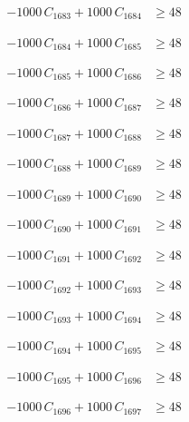 \documentclass[a4paper,11pt]{article}
\begin{document}
\begin{align}
-1000\,C_{1683} + 1000\,C_{1684} &\geq 48 \nonumber
\end{align}

\begin{align}
-1000\,C_{1684} + 1000\,C_{1685} &\geq 48 \nonumber
\end{align}

\begin{align}
-1000\,C_{1685} + 1000\,C_{1686} &\geq 48 \nonumber
\end{align}

\begin{align}
-1000\,C_{1686} + 1000\,C_{1687} &\geq 48 \nonumber
\end{align}

\begin{align}
-1000\,C_{1687} + 1000\,C_{1688} &\geq 48 \nonumber
\end{align}

\begin{align}
-1000\,C_{1688} + 1000\,C_{1689} &\geq 48 \nonumber
\end{align}

\begin{align}
-1000\,C_{1689} + 1000\,C_{1690} &\geq 48 \nonumber
\end{align}

\begin{align}
-1000\,C_{1690} + 1000\,C_{1691} &\geq 48 \nonumber
\end{align}

\begin{align}
-1000\,C_{1691} + 1000\,C_{1692} &\geq 48 \nonumber
\end{align}

\begin{align}
-1000\,C_{1692} + 1000\,C_{1693} &\geq 48 \nonumber
\end{align}

\begin{align}
-1000\,C_{1693} + 1000\,C_{1694} &\geq 48 \nonumber
\end{align}

\begin{align}
-1000\,C_{1694} + 1000\,C_{1695} &\geq 48 \nonumber
\end{align}

\begin{align}
-1000\,C_{1695} + 1000\,C_{1696} &\geq 48 \nonumber
\end{align}

\begin{align}
-1000\,C_{1696} + 1000\,C_{1697} &\geq 48 \nonumber
\end{align}
\end{document}
